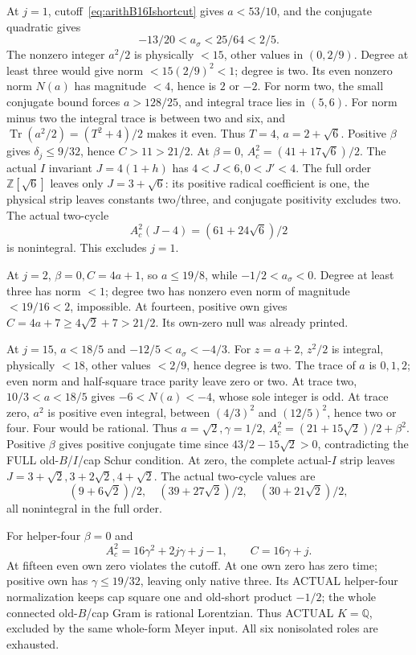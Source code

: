\documentclass[11pt]{article}
\begin{document}
At \(j=1\), cutoff~\eqref{eq:arithB16Ishortcut}
gives \(a<53/10\), and the conjugate
quadratic gives
\[
                     -13/20<a_\sigma<25/64<2/5 .
\]
The nonzero integer \(a^2/2\) is
physically \(<15\), other values in
\((0,2/9)\).
Degree at least three would give norm
\(<15(2/9)^2<1\); degree is two.
Its even nonzero norm \(N(a)\) has
magnitude \(<4\), hence is \(2\) or \(-2\).
For norm two, the small conjugate bound
forces \(a>128/25\), and integral trace
lies in \((5,6)\).
For norm minus two the integral trace is
between two and six, and
\(\operatorname{Tr}(a^2/2)=(T^2+4)/2\)
makes it even.
Thus \(T=4\), \(a=2+\sqrt6\).
Positive \(\beta\) gives \(\delta_j\le9/32\),
hence \(C>11>21/2\).
At \(\beta=0\), \(A_c^2=(41+17\sqrt6)/2\).
The actual \(I\) invariant
\(J=4(1+h)\) has \(4<J<6,0<J'<4\).
The full order \(\mathbb Z[\sqrt6]\)
leaves only \(J=3+\sqrt6\):
its positive radical coefficient is one,
the physical strip leaves constants
two/three, and conjugate positivity
excludes two.
The actual two-cycle
\[
                     A_c^2(J-4)=(61+24\sqrt6)/2
\]
is nonintegral.  This excludes \(j=1\).

At \(j=2\), \(\beta=0,C=4a+1\),
so \(a\le19/8\), while
\(-1/2<a_\sigma<0\).
Degree at least three has norm \(<1\);
degree two has nonzero even norm of
magnitude \(<19/16<2\), impossible.
At fourteen, positive own gives
\(C=4a+7\ge4\sqrt2+7>21/2\).
Its own-zero null was already printed.

At \(j=15\), \(a<18/5\) and
\(-12/5<a_\sigma<-4/3\).
For \(z=a+2\), \(z^2/2\) is integral,
physically \(<18\), other values
\(<2/9\), hence degree is two.
The trace of \(a\) is \(0,1,2\);
even norm and half-square trace parity
leave zero or two.
At trace two, \(10/3<a<18/5\)
gives \(-6<N(a)<-4\), whose sole
integer is odd.
At trace zero, \(a^2\) is positive
even integral, between \((4/3)^2\)
and \((12/5)^2\), hence two or four.
Four would be rational.
Thus \(a=\sqrt2,\gamma=1/2\),
\(A_c^2=(21+15\sqrt2)/2+\beta^2\).
Positive \(\beta\) gives positive
conjugate time since
\(43/2-15\sqrt2>0\), contradicting
the FULL old-\(B\)/\(I\)/cap Schur condition.
At zero, the complete actual-\(I\) strip
leaves \(J=3+\sqrt2,3+2\sqrt2,4+\sqrt2\).
The actual two-cycle values are
\[
                  (9+6\sqrt2)/2,\quad(39+27\sqrt2)/2,\quad
                                           (30+21\sqrt2)/2 ,
\]
all nonintegral in the full order.

For helper-four \(\beta=0\) and
\[
                 A_c^2=16\gamma^2+2j\gamma+j-1,\qquad C=16\gamma+j .
\]
At fifteen even own zero violates the
cutoff.
At one own zero has zero time;
positive own has \(\gamma\le19/32\),
leaving only native three.
Its ACTUAL helper-four normalization
keeps cap square one and old-short
product \(-1/2\); the whole connected
old-\(B\)/cap Gram is rational Lorentzian.
Thus ACTUAL \(K=\mathbb Q\), excluded
by the same whole-form Meyer input.
All six nonisolated roles are exhausted.
\end{document}
